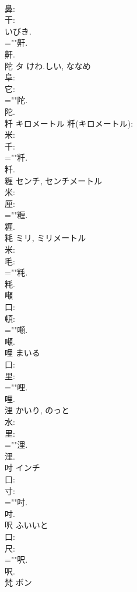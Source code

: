 \documentclass[8pt]{extreport}
\begin{document}
\begin{CJK}{UTF8}{min}
\\	鼻: 
\\	干: 
\\	いびき.
\\	=""鼾.
\\	鼾.
\\	陀	タ	けわ.しい, ななめ		
\\	阜: 
\\	它: 
\\	=""陀.
\\	陀.
\\	粁		キロメートル			粁(キロメートル): 
\\	米: 
\\	千: 
\\	=""粁.
\\	粁.
\\	糎		センチ, センチメートル				
\\	米: 
\\	厘: 
\\	=""糎.
\\	糎.
\\	粍		ミリ, ミリメートル				
\\	米: 
\\	毛: 
\\	=""粍.
\\	粍.
\\	噸						
\\	口: 
\\	頓: 
\\	=""噸.
\\	噸.
\\	哩		まいる				
\\	口: 
\\	里: 
\\	=""哩.
\\	哩.
\\	浬		かいり, のっと				
\\	水: 
\\	里: 
\\	=""浬.
\\	浬.
\\	吋		インチ				
\\	口: 
\\	寸: 
\\	=""吋.
\\	吋.
\\	呎		ふいいと				
\\	口: 
\\	尺: 
\\	=""呎.
\\	呎.
\\	梵	ボン			

\end{CJK}
\end{document}

